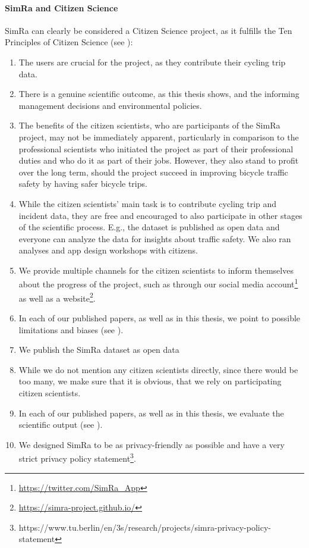 \paragraph{SimRa and Citizen Science}
SimRa can clearly be considered a Citizen Science project, as it fulfills the Ten Principles of Citizen Science (see ):
\begin{enumerate}
\item The users are crucial for the project, as they contribute their cycling trip data.
\item There is a genuine scientific outcome, as this thesis shows, and the informing management decisions and environmental policies.
\item The benefits of the citizen scientists, who are participants of the SimRa project, may not be immediately apparent, particularly in comparison to the professional scientists who initiated the project as part of their professional duties and who do it as part of their jobs.
However, they also stand to profit over the long term, should the project succeed in improving bicycle traffic safety by having safer bicycle trips.
\item While the citizen scientists' main task is to contribute cycling trip and incident data, they are free and encouraged to also participate in other stages of the scientific process.
E.g., the dataset is published as open data and everyone can analyze the data for insights about traffic safety.
We also ran analyses and app design workshops with citizens.
\item We provide multiple channels for the citizen scientists to inform themselves about the progress of the project, such as through our social media account\footnote{\url{https://twitter.com/SimRa_App}} as well as a website\footnote{\url{https://simra-project.github.io/}}.
\item In each of our published papers, as well as in this thesis, we point to possible limitations and biases (see ).
\item We publish the SimRa dataset as open data~\cite{dataset_simra_set1,dataset_simra_set2,dataset_simra_set3}
\item While we do not mention any citizen scientists directly, since there would be too many, we make sure that it is obvious, that we rely on participating citizen scientists.
\item In each of our published papers, as well as in this thesis, we evaluate the scientific output (see ).
\item We designed SimRa to be as privacy-friendly as possible and have a very strict privacy policy statement\footnote{https://www.tu.berlin/en/3s/research/projects/simra-privacy-policy-statement}.
\end{enumerate}

